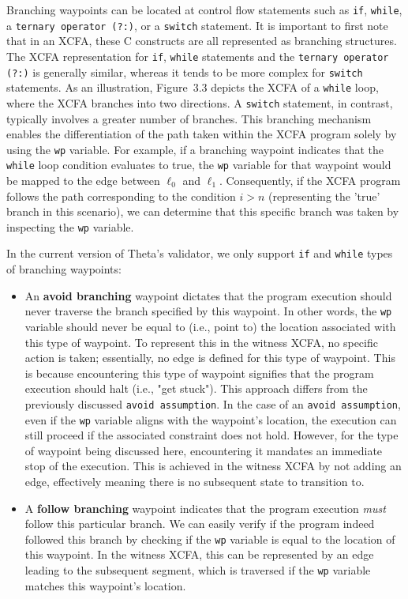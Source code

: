 Branching waypoints can be located at control flow statements such as \texttt{if}, \texttt{while}, a 
\texttt{ternary operator (?:)}, or a \texttt{switch} statement.
It is important to first note that in an XCFA, these C constructs are all represented as branching structures.
The XCFA representation for \texttt{if}, \texttt{while} statements and the \texttt{ternary operator (?:)} is generally 
similar, whereas it tends to be more complex for \texttt{switch} statements.
As an illustration, Figure~3.3 depicts the XCFA of a \texttt{while} loop, where the XCFA branches into two directions. 
A \texttt{switch} statement, in contrast, typically involves a greater number of branches.
This branching mechanism enables the differentiation of the path taken within the XCFA program 
solely by using the \texttt{wp} variable.
For example, if a branching waypoint indicates that the \texttt{while} loop condition evaluates to true,
the \texttt{wp} variable for that waypoint would be mapped to the edge between $\ell_0$ and $\ell_1$. 
Consequently, if the XCFA program follows the path corresponding to the condition $i>n$ (representing 
the 'true' branch in this scenario), we can determine that this specific branch was taken by inspecting 
the \texttt{wp} variable.



In the current version of Theta's validator, we only support \texttt{if} and \texttt{while} types of branching waypoints:
\begin{itemize}
  \item An \textbf{avoid branching} waypoint dictates that the program execution should never 
    traverse the branch specified by this waypoint. In other words, the \texttt{wp} variable 
    should never be equal to (i.e., point to) the location associated with this type of waypoint.
    To represent this in the witness XCFA, no specific action is taken; essentially, no edge is defined 
    for this type of waypoint. This is because encountering this type of waypoint signifies that the
    program execution should halt (i.e., "get stuck").
    This approach differs from the previously discussed \texttt{avoid assumption}. In the case of an 
    \texttt{avoid assumption}, even if the \texttt{wp} variable aligns with the waypoint's location, 
    the execution can still proceed if the associated constraint does not hold.
    However, for the type of waypoint being discussed here, encountering it mandates an immediate stop of the execution.
    This is achieved in the witness XCFA by not adding an edge, effectively meaning there is no subsequent state to transition to.
  \item A \textbf{follow branching} waypoint indicates that the program execution \emph{must} 
    follow this particular branch. We can easily verify if the program indeed followed this
    branch by checking if the \texttt{wp} variable is equal to the location of this waypoint. 
    In the witness XCFA, this can be represented by an edge leading to the subsequent segment, which is
    traversed if the \texttt{wp} variable matches this waypoint's location.
\end{itemize}

